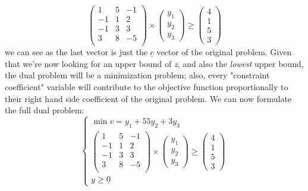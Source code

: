                 \begin{equation}
                    \begin{pmatrix}
                        1 & 5 & -1 \\
                        -1 & 1 & 2 \\
                        -1 & 3 & 3 \\
                        3 & 8 & -5 \\
                    \end{pmatrix}
                    \times
                    \begin{pmatrix}y_1 \\ y_2 \\ y_3\end{pmatrix}
                    \geq
                    \begin{pmatrix} 4 \\ 1 \\ 5 \\ 3 \end{pmatrix}
                \end{equation}
                we can see as the last vector is just the $\underline{c}$ vector of the original problem. Given that we're now looking for an upper bound of \emph{z}, and also the \textit{lowest} upper bound, the dual problem will be a minimization problem; also, every "constraint coefficient" variable will contribute to the objective function proportionally to their right hand side coefficient of the original problem. We can now formulate the full dual problem:
                \begin{equation}
                    \begin{cases}
                        \min v = y_1 + 55 y_2 + 3 y_3 \\
                        \begin{pmatrix}
                            1 & 5 & -1 \\
                            -1 & 1 & 2 \\
                            -1 & 3 & 3 \\
                            3 & 8 & -5 \\
                        \end{pmatrix}
                        \times
                        \begin{pmatrix}y_1 \\ y_2 \\ y_3\end{pmatrix}
                        \geq
                        \begin{pmatrix} 4 \\ 1 \\ 5 \\ 3 \end{pmatrix} \\
                        y \geq \underline{0}
                    \end{cases}
                \end{equation}

